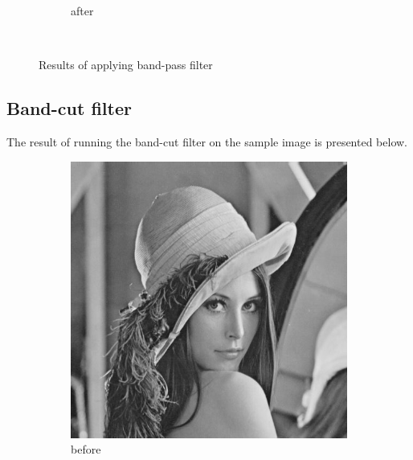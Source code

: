\documentclass[12pt]{article}
\begin{document}
\begin{figure}[H]
\begin{subfigure}[t]{\subfiguresize}
        \caption{after}
    \end{subfigure}\\[1em]
    \caption{Results of applying band-pass filter}
\end{figure}  
\subsection{Band-cut filter}
The result of running the band-cut filter on the sample image is presented below.
\begin{figure}[H]\centering
    \begin{subfigure}[t]{\subfiguresize}\centering
        \includegraphics[width=\textwidth]{img/lena.png}
        \caption{before}
    \end{subfigure}
    \hspace{2em}
    \begin{subfigure}[t]{\subfiguresize}\centering

\end{subfigure}
\end{figure}
\end{document}
